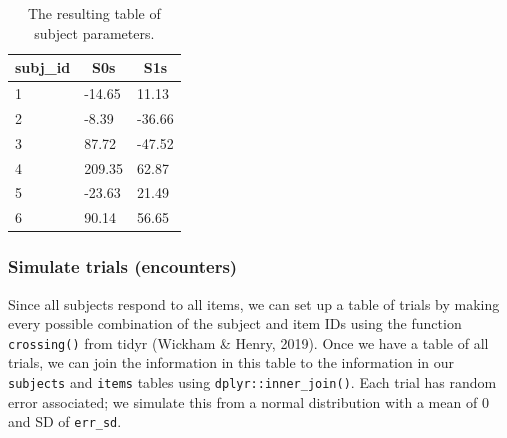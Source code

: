 \documentclass[doc,floatsintext]{apa6}
\newenvironment{Shaded}{\begin{snugshade}}{\end{snugshade}}
\newcommand{\KeywordTok}[1]{\textcolor[rgb]{0.13,0.29,0.53}{\textbf{#1}}}
\newcommand{\DataTypeTok}[1]{\textcolor[rgb]{0.13,0.29,0.53}{#1}}
\newcommand{\DecValTok}[1]{\textcolor[rgb]{0.00,0.00,0.81}{#1}}
\newcommand{\StringTok}[1]{\textcolor[rgb]{0.31,0.60,0.02}{#1}}
\newcommand{\CommentTok}[1]{\textcolor[rgb]{0.56,0.35,0.01}{\textit{#1}}}
\newcommand{\OperatorTok}[1]{\textcolor[rgb]{0.81,0.36,0.00}{\textbf{#1}}}
\newcommand{\NormalTok}[1]{#1}
\begin{document}
\begin{table}[H]
\begin{center}
\begin{threeparttable}
\caption{\label{tab:subj-table}The resulting table of subject parameters.}
\begin{tabular}{lll}
\toprule
subj\_id & \multicolumn{1}{c}{S0s} & \multicolumn{1}{c}{S1s}\\
\midrule
1 & -14.65 & 11.13\\
2 & -8.39 & -36.66\\
3 & 87.72 & -47.52\\
4 & 209.35 & 62.87\\
5 & -23.63 & 21.49\\
6 & 90.14 & 56.65\\
\bottomrule
\end{tabular}
\end{threeparttable}
\end{center}
\end{table}

\subsubsection{Simulate trials
(encounters)}\label{simulate-trials-encounters}

Since all subjects respond to all items, we can set up a table of trials
by making every possible combination of the subject and item IDs using
the function \texttt{crossing()} from tidyr (Wickham \& Henry, 2019).
Once we have a table of all trials, we can join the information in this
table to the information in our \texttt{subjects} and \texttt{items}
tables using \texttt{dplyr::inner\_join()}. Each trial has random error
associated; we simulate this from a normal distribution with a mean of 0
and SD of \texttt{err\_sd}.

\begin{Shaded}
\end{Shaded}
\end{document}
